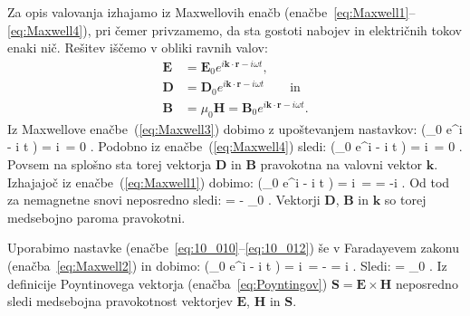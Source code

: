 Za opis valovanja izhajamo iz Maxwellovih enačb (enačbe~\ref{eq:Maxwell1}--\ref{eq:Maxwell4}), 
pri čemer privzamemo, da sta gostoti nabojev in električnih tokov enaki nič. 
Rešitev iščemo v obliki ravnih valov:
\begin{align}
 \mathbf{E} &= \mathbf{E}_0 e^{i\mathbf{k}\cdot \mathbf{r} - i \omega t}, \label{eq:10_010}\\
 \mathbf{D} &= \mathbf{D}_0 e^{i\mathbf{k}\cdot \mathbf{r} - i \omega t} \qquad \mathrm{in}\label{eq:10_011}\\
 \mathbf{B} &= \mu_0 \mathbf{H} = \mathbf{B}_0 e^{i\mathbf{k}\cdot \mathbf{r} - i \omega t}.
 \label{eq:10_012}
\end{align}
Iz Maxwellove enačbe~(\ref{eq:Maxwell3}) dobimo z upoštevanjem nastavkov:
\beq
\nabla \cdot \left(_0 e^{i\cdot {} - i \omega t} \right) = 
i\,\cdot {} = 0 \qquad \Longrightarrow \qquad {} \perp {}.
\label{eq:10_013}
\eeq
Podobno iz enačbe~(\ref{eq:Maxwell4}) sledi:
\beq
\nabla \cdot \left(_0 e^{i\cdot {} - i \omega t} \right) = 
i\,\cdot {} = 0 \qquad \Longrightarrow \qquad {} \perp {}.
\label{eq:10_014}
\eeq
Povsem na splošno sta torej vektorja $\mathbf{D}$ in $\mathbf{B}$ pravokotna na valovni vektor $\mathbf{k}$.
Izhajajoč iz enačbe~(\ref{eq:Maxwell1}) dobimo:
\beq
\nabla \times \left(_0 e^{i\cdot {} - i \omega t} \right) = 
i\,\times {} =  = -i \omega {}.
\label{eq:10_015}
\eeq
Od tod za nemagnetne snovi neposredno sledi:
\beq
{}\times {} = - \mu_0 \omega {} \qquad \Longrightarrow \qquad {} \perp {}.
\label{eq:10_016}
\eeq
Vektorji $\mathbf{D}$, $\mathbf{B}$ in $\mathbf{k}$ so torej medsebojno paroma pravokotni.

Uporabimo nastavke (enačbe~\ref{eq:10_010}--\ref{eq:10_012})
še v Faradayevem zakonu (enačba~\ref{eq:Maxwell2}) in dobimo:
\beq
\nabla \times \left(_0 e^{i\cdot {} - i \omega t} \right) = 
i\,\times {} = -  = i \omega {}.
\label{eq:10_017}
\eeq
Sledi:
\beq
{}\times {} = \omega \mu_0  \qquad \Longrightarrow 
\qquad {} \perp {}.
\label{eq:10_018}
\eeq
Iz definicije Poyntinovega vektorja (enačba~\ref{eq:Poyntingov}) 
$\mathbf{S} = \mathbf{E} \times \mathbf{H}$ neposredno sledi medsebojna 
pravokotnost vektorjev $\mathbf{E}$, $\mathbf{H}$ in $\mathbf{S}$.

